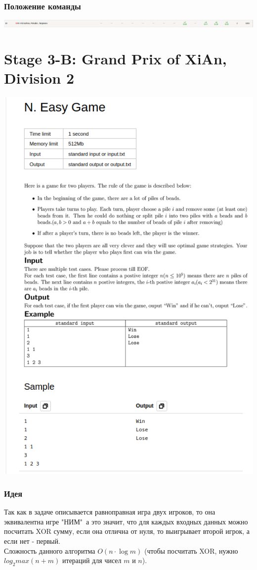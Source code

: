 \documentclass[12pt]{article}
\begin{document}
\subsubsection*{Положение команды}
\includegraphics[scale=0.4]{images/2.png}\newline\noindent

\pagebreak
\section{Stage 3-B: Grand Prix of XiAn, Division 2}
\includegraphics[scale=0.75]{statements/3_N.png}
\subsubsection*{Идея}
Так как в задаче описывается равноправная игра двух игроков, то она 
\\эквивалентна игре "НИМ"\, а это значит, что
для каждых входных данных можно посчитать XOR сумму, если она отлична от нуля, то выигрывает второй игрок, а если нет - первый.
\\ 
Сложность данного алгоритма $O(n \cdot \log{m})$ (чтобы посчитать XOR, нужно $log_2{max(n+m)}$ итераций для чисел $m$ и $n$).
\end{document}
